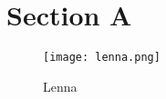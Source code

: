 \documentclass[12pt,fleqn,dvipdfmx]{jarticle}
\begin{document}
  \section{Section A}
    \HelloWorld
    \begin{figure}[h]
      \texttt{[image: lenna.png]}
      \centering
      \caption{Lenna}
    \end{figure}

  
\end{document}
